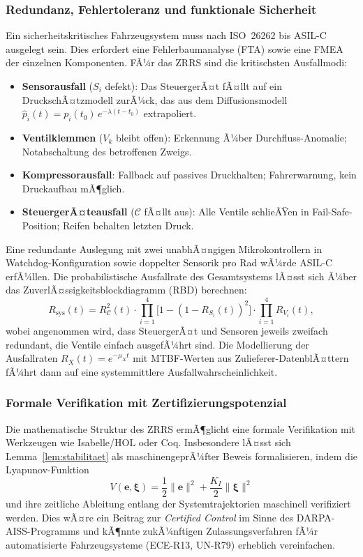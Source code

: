 ﻿\documentclass[a4paper,12pt]{article}
\theoremstyle{definition}
\begin{document}
\subsubsection{Redundanz, Fehlertoleranz und funktionale Sicherheit}

Ein sicherheitskritisches Fahrzeugsystem muss nach ISO~26262 bis ASIL-C
ausgelegt sein. Dies erfordert eine Fehler\-baum\-analyse (FTA) sowie
eine FMEA der einzelnen Komponenten. FÃ¼r das ZRRS sind die
kritischsten Ausfallmodi:

\begin{itemize}
    \item \textbf{Sensorausfall} ($S_i$ defekt): Das SteuergerÃ¤t fÃ¤llt auf
    ein DruckschÃ¤tzmodell zurÃ¼ck, das aus dem Diffusionsmodell
    $\hat{p}_i(t) = p_i(t_0)\,e^{-\lambda(t-t_0)}$ extrapoliert.
    \item \textbf{Ventilklemmen} ($V_k$ bleibt offen): Erkennung Ã¼ber
    Durchfluss-Anomalie; Notabschaltung des betroffenen Zweigs.
    \item \textbf{Kompressorausfall}: Fallback auf passives Druckhalten;
    Fahrerwarnung, kein Druckaufbau mÃ¶glich.
    \item \textbf{SteuergerÃ¤teausfall} ($\mathcal{C}$ fÃ¤llt aus): Alle
    Ventile schlieÃŸen in Fail-Safe-Position; Reifen behalten letzten Druck.
\end{itemize}

Eine redundante Auslegung mit zwei unabhÃ¤ngigen Mikrokontrollern in
Watchdog-Konfiguration sowie doppelter Sensorik pro Rad wÃ¼rde ASIL-C
erfÃ¼llen. Die probabilistische Ausfallrate des Gesamtsystems lÃ¤sst sich
Ã¼ber das ZuverlÃ¤ssigkeitsblockdiagramm (RBD) berechnen:
\[
    R_{\text{sys}}(t) = R_{\mathcal{C}}^2(t) \cdot
    \prod_{i=1}^{4} \bigl[1 - (1-R_{S_i}(t))^2\bigr] \cdot
    \prod_{i=1}^{4} R_{V_i}(t),
\]
wobei angenommen wird, dass SteuergerÃ¤t und Sensoren jeweils zweifach
redundant, die Ventile einfach ausgefÃ¼hrt sind. Die Modellierung
der Ausfallraten $R_X(t) = e^{-\mu_X t}$ mit MTBF-Werten aus
Zulieferer-DatenblÃ¤ttern fÃ¼hrt dann auf eine systemmittlere
Ausfallwahrscheinlichkeit.

\subsubsection{Formale Verifikation mit Zertifizierungspotenzial}

Die mathematische Struktur des ZRRS ermÃ¶glicht eine formale Verifikation
mit Werkzeugen wie Isabelle/HOL oder Coq. Insbesondere lÃ¤sst sich
Lemma~\ref{lem:stabilitaet} als maschinengeprÃ¼fter Beweis formalisieren,
indem die Lyapunov-Funktion
\[
    V(\mathbf{e}, \boldsymbol{\xi}) = \frac{1}{2}\|\mathbf{e}\|^2
    + \frac{K_I}{2}\|\boldsymbol{\xi}\|^2
\]
und ihre zeitliche Ableitung entlang der Systemtrajektorien maschinell
verifiziert werden. Dies wÃ¤re ein Beitrag zur \emph{Certified Control}
im Sinne des DARPA-AISS-Programms und kÃ¶nnte zukÃ¼nftigen
Zulassungsverfahren fÃ¼r automatisierte Fahrzeugsysteme (ECE-R13, UN-R79)
erheblich vereinfachen.
\end{document}
